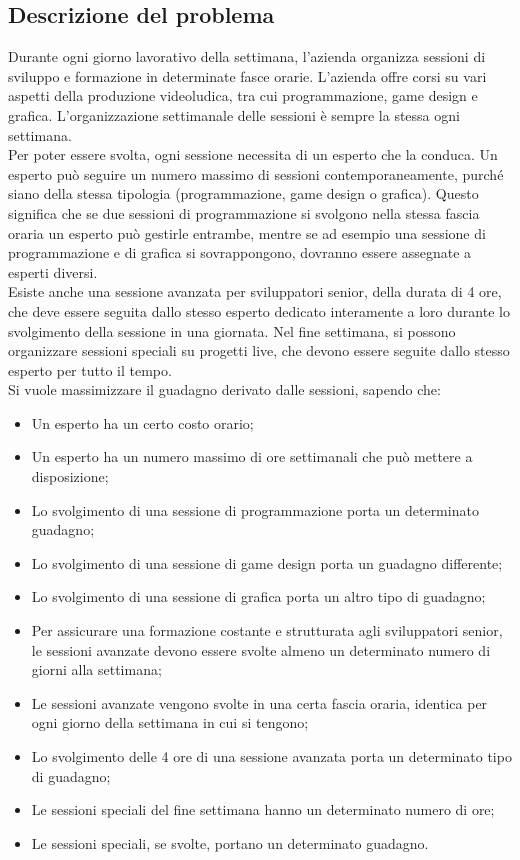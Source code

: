 \documentclass[12pt]{article}
\begin{document}
    \subsection{Descrizione del problema}
    Durante ogni giorno lavorativo della settimana, l'azienda organizza sessioni di sviluppo e formazione in determinate fasce orarie. L'azienda offre corsi su vari aspetti della produzione videoludica, tra cui programmazione, game design e grafica. L'organizzazione settimanale delle sessioni è sempre la stessa ogni settimana.\\
    Per poter essere svolta, ogni sessione necessita di un esperto che la conduca. Un esperto può seguire un numero massimo di sessioni contemporaneamente, purché siano della stessa tipologia (programmazione, game design o grafica). Questo significa che se due sessioni di programmazione si svolgono nella stessa fascia oraria un esperto può gestirle entrambe, mentre se ad esempio una sessione di programmazione e di grafica si sovrappongono, dovranno essere assegnate a esperti diversi.\\
    Esiste anche una sessione avanzata per sviluppatori senior, della durata di 4 ore, che deve essere seguita dallo stesso esperto dedicato interamente a loro durante lo svolgimento della sessione in una giornata. Nel fine settimana, si possono organizzare sessioni speciali su progetti live, che devono essere seguite dallo stesso esperto per tutto il tempo.\\
    Si vuole massimizzare il guadagno derivato dalle sessioni, sapendo che:
    \begin{itemize}
        \item Un esperto ha un certo costo orario;
        \item Un esperto ha un numero massimo di ore settimanali che può mettere a disposizione;
        \item Lo svolgimento di una sessione di programmazione porta un determinato guadagno;
        \item Lo svolgimento di una sessione di game design porta un guadagno differente;
        \item Lo svolgimento di una sessione di grafica porta un altro tipo di guadagno;
        \item Per assicurare una formazione costante e strutturata agli sviluppatori senior, le sessioni avanzate devono essere svolte almeno un determinato numero di giorni alla settimana;
        \item Le sessioni avanzate vengono svolte in una certa fascia oraria, identica per ogni giorno della settimana in cui si tengono;
        \item Lo svolgimento delle 4 ore di una sessione avanzata porta un determinato tipo di guadagno;
        \item Le sessioni speciali del fine settimana hanno un determinato numero di ore;
        \item Le sessioni speciali, se svolte, portano un determinato guadagno.
    \end{itemize}
\end{document}
